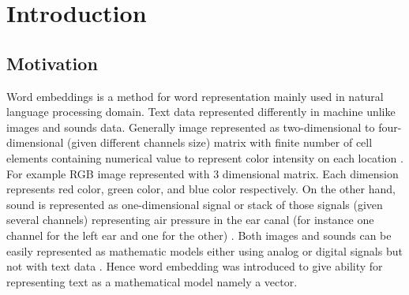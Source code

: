 \chapter{Introduction}
\label{chap:intro}

\section{Motivation} 
    Word embeddings is a method for word representation mainly used in
    natural language processing domain. Text data represented
    differently in machine unlike images and sounds data. Generally
    image represented as two-dimensional to four-dimensional (given
    different channels size) matrix with finite number of cell
    elements containing numerical value to represent color intensity
    on each location \citep{imageprocessing2018tyagi}. For example RGB
    image represented with 3 dimensional matrix. Each dimension
    represents red color, green color, and blue color respectively. On
    the other hand, sound is represented as one-dimensional signal or
    stack of those signals (given several channels) representing air
    pressure in the ear canal (for instance one channel for the left
    ear and one for the other) \citep{sound1995rocchesso}. Both images
    and sounds can be easily represented as mathematic models either
    using analog or digital signals but not with text data
    \citep{wordembedding2017yang}. Hence word embedding was introduced
    to give ability for representing text as a mathematical model
    namely a vector.
    
